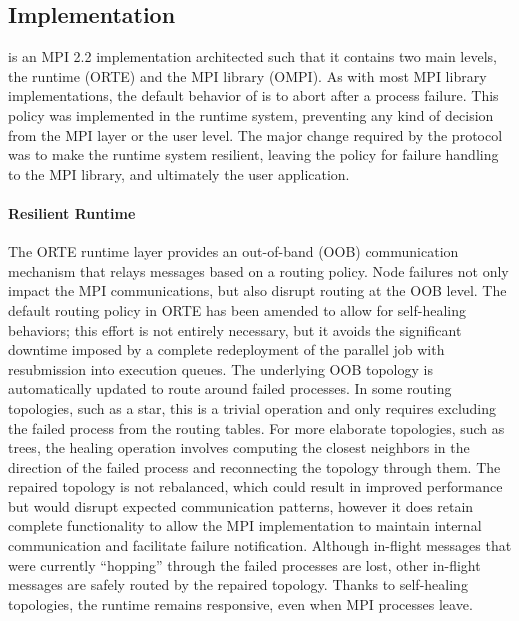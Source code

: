 \subsection{\ompi Implementation\label{sec:mpi}}

\ompi is an MPI 2.2 implementation architected such that it contains two main
levels, the runtime (ORTE) and the MPI library (OMPI). As with most MPI library
implementations, the default behavior of \ompi is to abort after a process
failure. This policy was implemented in the runtime system, preventing any kind
of decision from the MPI layer or the user level. The major change required by
the \cof protocol was to make the runtime system resilient, leaving the policy
for failure handling to the MPI library, and ultimately the user application.

\paragraph*{Resilient Runtime} The ORTE runtime layer provides an out-of-band
(OOB) communication mechanism that relays messages based on a routing policy.
Node failures not only impact the MPI communications, but also disrupt routing
at the OOB level. The default routing policy in ORTE has been amended to allow
for self-healing behaviors; this effort is not entirely necessary, but it avoids
the significant downtime imposed by a complete redeployment of the parallel job
with resubmission into execution queues. The underlying OOB topology is
automatically updated to route around failed processes. In some routing
topologies, such as a star, this is a trivial operation and only requires
excluding the failed process from the routing tables. For more elaborate
topologies, such as trees, the healing operation involves computing
the closest neighbors in the direction of the failed process and reconnecting
the topology through them. The repaired topology is not rebalanced, which could
result in improved performance but would disrupt expected communication
patterns, however it does retain complete functionality to allow the MPI
implementation to maintain internal communication and facilitate failure
notification. Although in-flight messages that were currently ``hopping''
through the failed processes are lost, other in-flight messages are safely
routed by the repaired topology. Thanks to self-healing topologies, the runtime
remains responsive, even when MPI processes leave.

